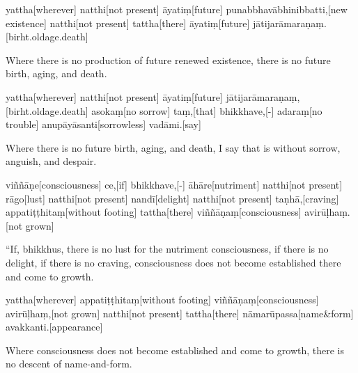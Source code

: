 \begin{samepage}
\begingl[glneveryline={\PaliGlossA,\PaliGlossB}]
yattha[wherever] natthi[not present] āyatiṃ[future] punabbhavābhinibbatti,[new existence] natthi[not present] tattha[there] āyatiṃ[future] jātijarāmaraṇaṃ.[birht.oldage.death]
\endgl
\nopagebreak
\linespread{0.5}
\begin{spacin}{0.2}
{\PaliGlossFT Where there is no production of future renewed existence, there is no future birth, aging, and death.}
\end{spacin}
\vskip 12pt
\end{samepage}
\begin{samepage}
\begingl[glneveryline={\PaliGlossA,\PaliGlossB}]
yattha[wherever] natthi[not present] āyatiṃ[future] jātijarāmaraṇaṃ,[birht.oldage.death] asokaṃ[no sorrow] taṃ,[that] bhikkhave,[-] adaraṃ[no trouble] anupāyāsanti[sorrowless] vadāmi.[say]
\endgl
\nopagebreak
\linespread{0.5}
\begin{spacin}{0.2}
{\PaliGlossFT Where there is no future birth, aging, and death, I say that is without sorrow, anguish, and despair.}
\end{spacin}
\vskip 12pt
\end{samepage}
\vskip 0.2in
\begin{samepage}
\begingl[glneveryline={\PaliGlossA,\PaliGlossB}]
viññāṇe[consciousness] ce,[if] bhikkhave,[-] āhāre[nutriment] natthi[not present] rāgo[lust] natthi[not present] nandī[delight] natthi[not present] taṇhā,[craving] appatiṭṭhitaṃ[without footing] tattha[there] viññāṇaṃ[consciousness] avirūḷhaṃ.[not grown]
\endgl
\nopagebreak
\linespread{0.5}
\begin{spacin}{0.2}
{\PaliGlossFT “If, bhikkhus, there is no lust for the nutriment consciousness, if there is no delight, if there is no craving, consciousness does not become established there and come to growth.}
\end{spacin}
\vskip 12pt
\end{samepage}
\begin{samepage}
\begingl[glneveryline={\PaliGlossA,\PaliGlossB}]
yattha[wherever] appatiṭṭhitaṃ[without footing] viññāṇaṃ[consciousness] avirūḷhaṃ,[not grown] natthi[not present] tattha[there] nāmarūpassa[name\&form] avakkanti.[appearance]
\endgl
\nopagebreak
\linespread{0.5}
\begin{spacin}{0.2}
{\PaliGlossFT Where consciousness does not become established and come to growth, there is no descent of name-and-form.}
\end{spacin}
\vskip 12pt
\end{samepage}
